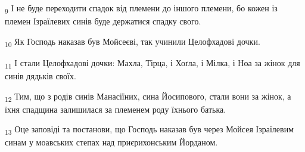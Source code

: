 \begin{tcolorbox}
\textsubscript{9} І не буде переходити спадок від племени до іншого племени, бо кожен із племен Ізраїлевих синів буде держатися спадку свого.
\end{tcolorbox}
\begin{tcolorbox}
\textsubscript{10} Як Господь наказав був Мойсеєві, так учинили Целофхадові дочки.
\end{tcolorbox}
\begin{tcolorbox}
\textsubscript{11} І стали Целофхадові дочки: Махла, Тірца, і Хоґла, і Мілка, і Ноа за жінок для синів дядьків своїх.
\end{tcolorbox}
\begin{tcolorbox}
\textsubscript{12} Тим, що з родів синів Манасіїних, сина Йосипового, стали вони за жінок, а їхня спадщина залишилася за племенем роду їхнього батька.
\end{tcolorbox}
\begin{tcolorbox}
\textsubscript{13} Оце заповіді та постанови, що Господь наказав був через Мойсея Ізраїлевим синам у моавських степах над приєрихонським Йорданом.
\end{tcolorbox}
